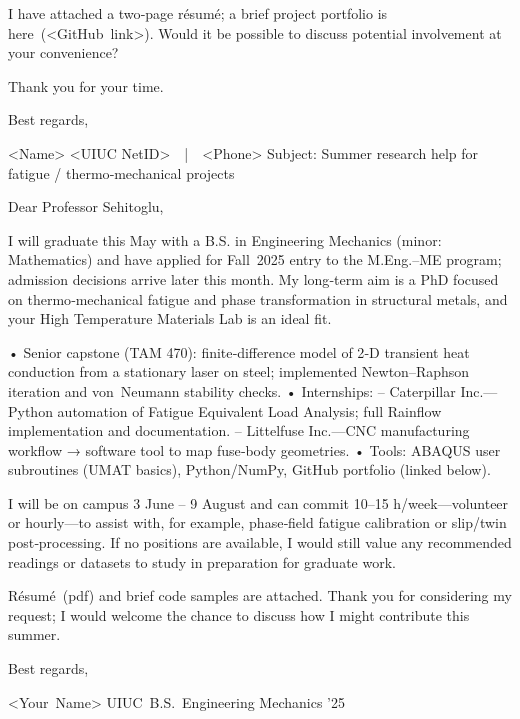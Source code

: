\documentclass[12pt]{article}
\theoremstyle{definition} %
\theoremstyle{plain} %
\begin{document}
I have attached a two‑page résumé; a brief project portfolio is
here (<GitHub link>).  Would it be possible to discuss potential
involvement at your convenience?

Thank you for your time.

Best regards,

<Name>  
<UIUC NetID>  |  <Phone>
Subject: Summer research help for fatigue / thermo‑mechanical projects

Dear Professor Sehitoglu,

I will graduate this May with a B.S. in Engineering Mechanics (minor: Mathematics) and have applied for Fall 2025 entry to the M.Eng.–ME program; admission decisions arrive later this month.  My long‑term aim is a PhD focused on thermo‑mechanical fatigue and phase transformation in structural metals, and your High Temperature Materials Lab is an ideal fit.

• Senior capstone (TAM 470): finite‑difference model of 2‑D transient heat conduction from a stationary laser on steel; implemented Newton–Raphson iteration and von Neumann stability checks.  
• Internships:  
  – Caterpillar Inc.—Python automation of Fatigue Equivalent Load Analysis; full Rainflow implementation and documentation.  
  – Littelfuse Inc.—CNC manufacturing workflow → software tool to map fuse‑body geometries.  
• Tools: ABAQUS user subroutines (UMAT basics), Python/NumPy, GitHub portfolio (linked below).

I will be on campus 3 June – 9 August and can commit 10–15 h/week—volunteer or hourly—to assist with, for example, phase‑field fatigue calibration or slip/twin post‑processing.  If no positions are available, I would still value any recommended readings or datasets to study in preparation for graduate work.

Résumé (pdf) and brief code samples are attached.  Thank you for considering my request; I would welcome the chance to discuss how I might contribute this summer.

Best regards,

<Your Name>  
UIUC B.S. Engineering Mechanics '25  
\end{document}
